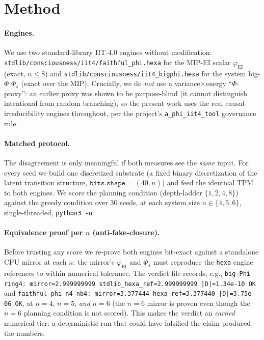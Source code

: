\documentclass[11pt,a4paper]{article}
\newcommand{\faithful}{\ensuremath{\varphi_{\mathrm{EI}}}}
\newcommand{\bigphi}{\ensuremath{\Phi_{s}}}
\begin{document}
\section{Method}
\label{sec:method}

\paragraph{Engines.} We use two standard-library IIT-4.0 engines without
modification: \texttt{stdlib/consciousness/iit4/faithful\_phi.hexa} for the
MIP-EI scalar \faithful{} (exact, $n\le 8$) and
\texttt{stdlib/consciousness/iit4\_bigphi.hexa} for the system big-$\Phi$
\bigphi{} (exact over the MIP). Crucially, we do \emph{not} use a
variance$\times$energy ``$\Phi$-proxy'': an earlier proxy was shown to be
purpose-blind (it cannot distinguish intentional from random branching), so
the present work uses the real causal-irreducibility engines throughout, per
the project's \texttt{a\_phi\_iit4\_tool} governance rule.

\paragraph{Matched protocol.} The disagreement is only meaningful if both
measures see the \emph{same} input. For every seed we build one discretized
substrate (a fixed binary discretization of the latent transition structure,
$\texttt{bits.shape}=(40,n)$) and feed the identical TPM to both engines. We
score the planning condition (depth-ladder $\{1,2,4,8\}$) against the greedy
condition over 30 seeds, at each system size $n\in\{4,5,6\}$, single-threaded,
\texttt{python3 -u}.

\paragraph{Equivalence proof per $n$ (anti-fake-closure).} Before trusting any
score we re-prove both engines bit-exact against a standalone CPU mirror at
each $n$: the mirror's \faithful{} and \bigphi{} must reproduce the
\texttt{hexa} engine references to within numerical tolerance. The verdict file
records, e.g., \texttt{big-Phi ring4: mirror=2.999999999
stdlib\_hexa\_ref=2.999999999 |D|=1.34e-10 OK} and
\texttt{faithful\_phi n4 nb4: mirror=3.377444 hexa\_ref=3.377440
|D|=3.75e-06 OK}, at $n=4$, $n=5$, \emph{and} $n=6$ (the $n=6$ mirror is
proven even though the $n=6$ planning condition is not scored). This makes the
verdict an \emph{earned} numerical tier: a deterministic run that could
have falsified the claim produced the numbers.
\end{document}
